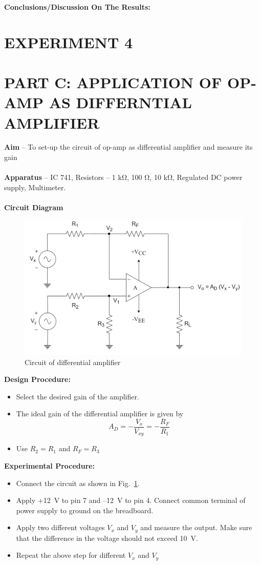 \documentclass[9pt]{scrreprt}
\begin{document}
\textbf{Conclusions/Discussion On The Results:}

\newpage

\section*{\centering EXPERIMENT 4}
\section*{\normalsize PART C: APPLICATION OF OP-AMP AS DIFFERNTIAL AMPLIFIER}
\textbf{Aim} – To set-up the circuit of op-amp as differential amplifier and measure its gain\\
\\
\textbf{Apparatus} – IC 741, Resistors – 1 k$\si{\ohm}$, 100 $\si{\ohm}$, 10 k$\si{\ohm}$, Regulated DC power supply, Multimeter.\\
\\
\textbf{Circuit Diagram}

\begin{figure}[H]
	\centering
	\includegraphics[width=0.5\linewidth]{logos/Differential_amp.png}
	\caption{Circuit of differential amplifier}
	\label{fig:Diff_amp}
\end{figure}

\textbf{Design Procedure:}
\begin{itemize}
\item Select the desired gain of the amplifier.
\item The ideal gain of the differential amplifier is given by
\begin{equation*}
A_D = - \frac{V_o}{V_{xy}} = - \frac{R_F}{R_1}
\end{equation*}
\item Use $R_2 = R_1$ and $R_F = R_3$
\end{itemize}

\textbf{Experimental Procedure:}
\begin{itemize}
\item Connect the circuit as shown in Fig.~\ref{fig:Diff_amp}.
\item Apply +12~V to pin 7 and –12~V to pin 4. Connect common terminal of power supply to ground on the breadboard.
\item Apply two different voltages $V_x$ and $V_y$ and measure the output. Make sure that the difference in the voltage should not exceed 10~V.
\item Repeat the above step for different $V_x$ and $V_y$
\end{itemize}
\end{document}
